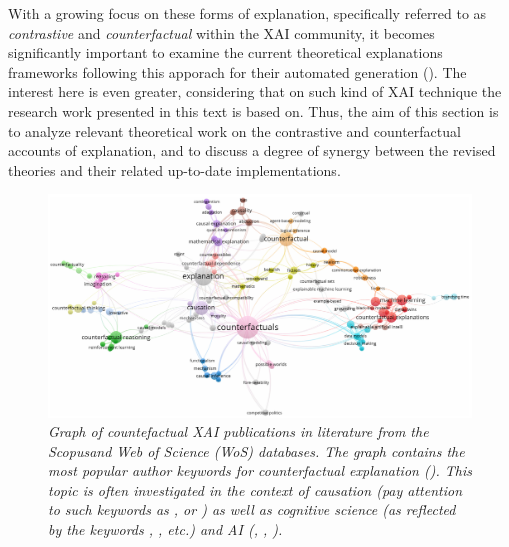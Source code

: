 \documentclass[binding=0.6cm]{sapthesis}
\newcommand{\mycite}[1]{(\cite{#1})}
\begin{document}
With a growing focus on these forms of explanation, specifically referred to as \textit{contrastive} and \textit{counterfactual} within the XAI community, it becomes significantly important to examine the current theoretical explanations frameworks following this apporach for their automated generation \mycite{stepin2021-xai-cf-contrative-survey}. The interest here is even greater, considering that on such kind of XAI technique the research work presented in this text is based on. Thus, the aim of this section is to analyze relevant theoretical work on the contrastive and counterfactual accounts of explanation, and to discuss a degree of synergy between the revised theories and their related up-to-date implementations.
\begin{figure}
    \centering
    \includegraphics[width=\textwidth]{imgs/background/xai-literature.png}
    \caption{\textit{Graph of countefactual XAI publications in literature from the Scopus\protect\footnotemark[1] and Web of Science (WoS\protect\footnotemark[2]) databases. The graph contains the most popular author keywords for counterfactual explanation \mycite{stepin2021-xai-cf-contrative-survey}. This topic is often investigated in the context of causation (pay attention to such keywords as \protect{}, \protect{} or \protect{}) as well as cognitive science (as reflected by the keywords \protect{}, \protect{}, etc.) and AI (\protect{}, \protect{}, \protect{}).}}
    \label{fig:br.xai.xai-graph}
\end{figure}

\end{document}
